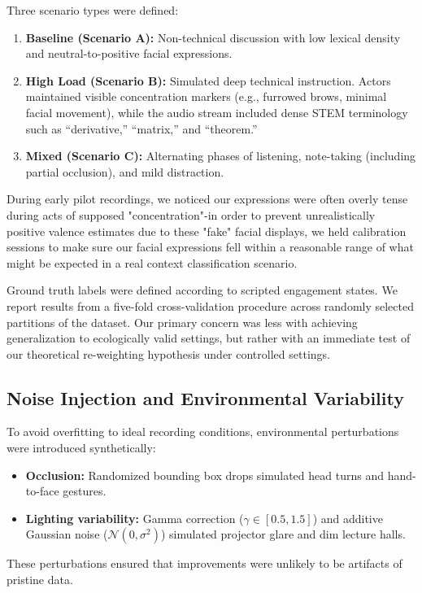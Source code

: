 \documentclass[conference]{IEEEtran}
\begin{document}
Three scenario types were defined:
\begin{enumerate}
    \item \textbf{Baseline (Scenario A):} Non-technical discussion with low lexical density and neutral-to-positive facial expressions.
    \item \textbf{High Load (Scenario B):} Simulated deep technical instruction. Actors maintained visible concentration markers (e.g., furrowed brows, minimal facial movement), while the audio stream included dense STEM terminology such as “derivative,” “matrix,” and “theorem.”
    \item \textbf{Mixed (Scenario C):} Alternating phases of listening, note-taking (including partial occlusion), and mild distraction.
\end{enumerate}

During early pilot recordings, we noticed our expressions were often overly tense during acts of supposed "concentration"-in order to prevent unrealistically positive valence estimates due to these "fake" facial displays, we held calibration sessions to make sure our facial expressions fell within a reasonable range of what might be expected in a real context classification scenario.

Ground truth labels were defined according to scripted engagement states. We report results from a five-fold cross-validation procedure across randomly selected partitions of the dataset. Our primary concern was less with achieving generalization to ecologically valid settings, but rather with an immediate test of our theoretical re-weighting hypothesis under controlled settings.

\subsection{Noise Injection and Environmental Variability}
To avoid overfitting to ideal recording conditions, environmental perturbations were introduced synthetically:
\begin{itemize}
    \item \textbf{Occlusion:} Randomized bounding box drops simulated head turns and hand-to-face gestures.
    \item \textbf{Lighting variability:} Gamma correction ($\gamma \in [0.5, 1.5]$) and additive Gaussian noise ($\mathcal{N}(0, \sigma^2)$) simulated projector glare and dim lecture halls.
\end{itemize}

These perturbations ensured that improvements were unlikely to be artifacts of pristine data.
\end{document}
